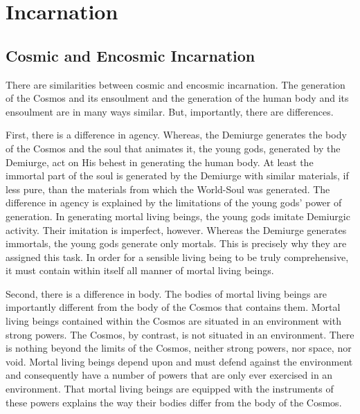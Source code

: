 \chapter{Incarnation} %
\label{cha:incarnation}

\section{Cosmic and Encosmic Incarnation} %
\label{sec:cosmic_and_encosmic_incarnation}

There are similarities between cosmic and encosmic incarnation. The generation of the Cosmos and its ensoulment and the generation of the human body and its ensoulment are in many ways similar. But, importantly, there are differences. 

First, there is a difference in agency. Whereas, the Demiurge generates the body of the Cosmos and the soul that animates it, the young gods, generated by the Demiurge, act on His behest in generating the human body. At least the immortal part of the soul is generated by the Demiurge with similar materials, if less pure, than the materials from which the World-Soul was generated. The difference in agency is explained by the limitations of the young gods' power of generation. In generating mortal living beings, the young gods imitate Demiurgic activity. Their imitation is imperfect, however. Whereas the Demiurge generates immortals, the young gods generate only mortals. This is precisely why they are assigned this task. In order for a sensible living being to be truly comprehensive, it must contain within itself all manner of mortal living beings. 

Second, there is a difference in body. The bodies of mortal living beings are importantly different from the body of the Cosmos that contains them. Mortal living beings contained within the Cosmos are situated in an environment with strong powers. The Cosmos, by contrast, is not situated in an environment. There is nothing beyond the limits of the Cosmos, neither strong powers, nor space, nor void. Mortal living beings depend upon and must defend against the environment and consequently have a number of powers that are only ever exercised in an environment. That mortal living beings are equipped with the instruments of these powers explains the way their bodies differ from the body of the Cosmos.

